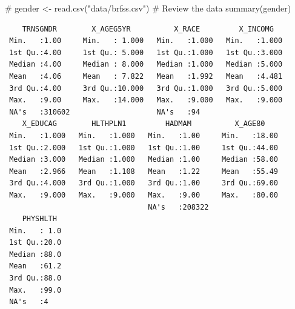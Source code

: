 \documentclass[
  letterpaper,
  DIV=11,
  numbers=noendperiod]{scrreprt}
\newenvironment{Shaded}{\begin{snugshade}}{\end{snugshade}}
\newcommand{\CommentTok}[1]{\textcolor[rgb]{0.37,0.37,0.37}{#1}}
\newcommand{\FunctionTok}[1]{\textcolor[rgb]{0.28,0.35,0.67}{#1}}
\newcommand{\NormalTok}[1]{\textcolor[rgb]{0.00,0.23,0.31}{#1}}
\newcommand{\OtherTok}[1]{\textcolor[rgb]{0.00,0.23,0.31}{#1}}
\newcommand{\StringTok}[1]{\textcolor[rgb]{0.13,0.47,0.30}{#1}}
\begin{document}
\begin{Shaded}
\begin{Highlighting}[]
\CommentTok{\#}
\NormalTok{gender }\OtherTok{\textless{}{-}} \FunctionTok{read.csv}\NormalTok{(}\StringTok{"data/brfss.csv"}\NormalTok{)}
\CommentTok{\# Review the data}
\FunctionTok{summary}\NormalTok{(gender)}
\end{Highlighting}
\end{Shaded}

\begin{verbatim}
    TRNSGNDR        X_AGEG5YR          X_RACE         X_INCOMG    
 Min.   :1.00     Min.   : 1.000   Min.   :1.000   Min.   :1.000  
 1st Qu.:4.00     1st Qu.: 5.000   1st Qu.:1.000   1st Qu.:3.000  
 Median :4.00     Median : 8.000   Median :1.000   Median :5.000  
 Mean   :4.06     Mean   : 7.822   Mean   :1.992   Mean   :4.481  
 3rd Qu.:4.00     3rd Qu.:10.000   3rd Qu.:1.000   3rd Qu.:5.000  
 Max.   :9.00     Max.   :14.000   Max.   :9.000   Max.   :9.000  
 NA's   :310602                    NA's   :94                     
    X_EDUCAG        HLTHPLN1         HADMAM          X_AGE80     
 Min.   :1.000   Min.   :1.000   Min.   :1.00     Min.   :18.00  
 1st Qu.:2.000   1st Qu.:1.000   1st Qu.:1.00     1st Qu.:44.00  
 Median :3.000   Median :1.000   Median :1.00     Median :58.00  
 Mean   :2.966   Mean   :1.108   Mean   :1.22     Mean   :55.49  
 3rd Qu.:4.000   3rd Qu.:1.000   3rd Qu.:1.00     3rd Qu.:69.00  
 Max.   :9.000   Max.   :9.000   Max.   :9.00     Max.   :80.00  
                                 NA's   :208322                  
    PHYSHLTH   
 Min.   : 1.0  
 1st Qu.:20.0  
 Median :88.0  
 Mean   :61.2  
 3rd Qu.:88.0  
 Max.   :99.0  
 NA's   :4     
\end{verbatim}
\end{document}
